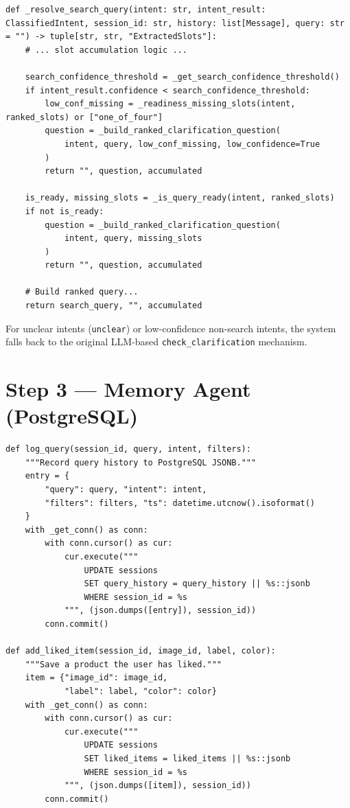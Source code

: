 \begin{lstlisting}[caption={Deterministic Clarification --- agent/fashion\_agent.py}]
def _resolve_search_query(intent: str, intent_result: ClassifiedIntent, session_id: str, history: list[Message], query: str = "") -> tuple[str, str, "ExtractedSlots"]:
    # ... slot accumulation logic ...
    
    search_confidence_threshold = _get_search_confidence_threshold()
    if intent_result.confidence < search_confidence_threshold:
        low_conf_missing = _readiness_missing_slots(intent, ranked_slots) or ["one_of_four"]
        question = _build_ranked_clarification_question(
            intent, query, low_conf_missing, low_confidence=True
        )
        return "", question, accumulated

    is_ready, missing_slots = _is_query_ready(intent, ranked_slots)
    if not is_ready:
        question = _build_ranked_clarification_question(
            intent, query, missing_slots
        )
        return "", question, accumulated
        
    # Build ranked query...
    return search_query, "", accumulated
\end{lstlisting}

For unclear intents (\texttt{unclear}) or low-confidence non-search intents, the system falls back to the original LLM-based \texttt{check\_clarification} mechanism.

\section{Step 3 --- Memory Agent (PostgreSQL)}

\begin{lstlisting}[caption={Memory Agent --- agent/memory.py}]
def log_query(session_id, query, intent, filters):
    """Record query history to PostgreSQL JSONB."""
    entry = {
        "query": query, "intent": intent,
        "filters": filters, "ts": datetime.utcnow().isoformat()
    }
    with _get_conn() as conn:
        with conn.cursor() as cur:
            cur.execute("""
                UPDATE sessions
                SET query_history = query_history || %s::jsonb
                WHERE session_id = %s
            """, (json.dumps([entry]), session_id))
        conn.commit()

def add_liked_item(session_id, image_id, label, color):
    """Save a product the user has liked."""
    item = {"image_id": image_id,
            "label": label, "color": color}
    with _get_conn() as conn:
        with conn.cursor() as cur:
            cur.execute("""
                UPDATE sessions
                SET liked_items = liked_items || %s::jsonb
                WHERE session_id = %s
            """, (json.dumps([item]), session_id))
        conn.commit()
\end{lstlisting}

